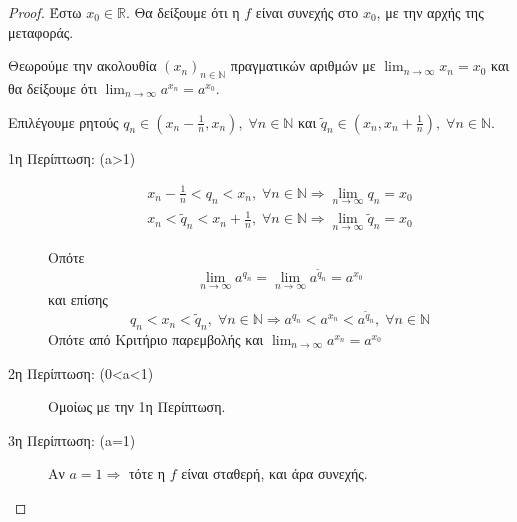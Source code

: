 \documentclass[main.tex]{subfiles}
\begin{document}
        \begin{proof}
        \item {}
            Έστω $ x_{0} \in \mathbb{R} $. Θα δείξουμε ότι η $f$ είναι συνεχής 
            στο $ x_{0} $, με την αρχής της μεταφοράς.

            Θεωρούμε την ακολουθία $ (x_{n})_{n \in \mathbb{N}} $ πραγματικών αριθμών 
            με $ \lim_{n \to \infty} x_{n} = x_{0} $ και θα δείξουμε ότι  
            $\lim_{n \to \infty} a^{x_{n}} = a^{x_{0}}$.

            Επιλέγουμε ρητούς $ q_{n} \in \left(x_{n} - \frac{1}{n}, x_{n}\right), 
            \; \forall n \in \mathbb{N} $ και $ \tilde{q}_{n} \in \left(x_{n}, x_{n}+ 
                \frac{1}{n} \right), \; \forall n \in \mathbb{N} $.

            \begin{description}
                \item [1η Περίπτωση: (a>1)]
                    \begin{gather*}
                        x_{n} - \frac{1}{n} < q_{n} < x_{n}, \; \forall n \in 
                        \mathbb{N} \Rightarrow \lim_{n \to \infty} q_{n} = x_{0} \\
                        x_{n} < \tilde{q}_{n} < x_{n}+ \frac{1}{n}, \; \forall n \in 
                        \mathbb{N} \Rightarrow \lim_{n \to \infty} \tilde{q}_{n} = x_{0}
                    \end{gather*}

                    Οπότε 
                    \[
                        \lim_{n \to \infty} a^{q_{n}} = 
                        \lim_{n \to \infty} a^{\tilde{q}_{n}} = a^{x_{0}}
                    \] 
                    και επίσης
                    \[
                        q_{n} < x_{n} < \tilde{q}_{n}, \; \forall n \in \mathbb{N} 
                        \Rightarrow a^{q_{n}} < a^{x_{n}} < a^{\tilde{q}_{n}}, \; 
                        \forall n \in \mathbb{N}
                    \] 
                    Οπότε από Κριτήριο παρεμβολής και 
                    $ \lim_{n \to \infty} a^{x_{n}} = a^{x_{0}} $ 
                \item [2η Περίπτωση: (0<a<1)]
                    Ομοίως με την 1η Περίπτωση.
                \item [3η Περίπτωση: (a=1)]
                    Αν $ a=1 \Rightarrow $ τότε η $f$ είναι σταθερή, και άρα συνεχής.
            \end{description}
        \end{proof}
\end{document}
